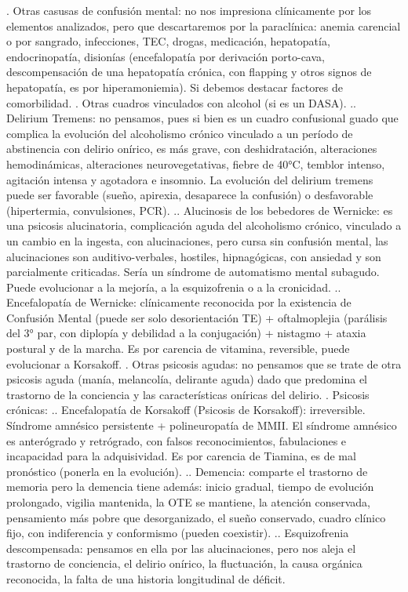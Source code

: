 \documentclass[encares.tex]{subfiles}
\begin{document}
. Otras casusas de confusión mental: no nos impresiona clínicamente por los elementos analizados, pero que descartaremos por la paraclínica: anemia carencial o por sangrado, infecciones, TEC, drogas, medicación, hepatopatía, endocrinopatía, disionías (encefalopatía por derivación porto-cava, descompensación de una hepatopatía crónica, con flapping y otros signos de hepatopatía, es por hiperamoniemia). Si debemos destacar factores de comorbilidad.
. Otras cuadros vinculados con alcohol (si es un DASA).
.. Delirium Tremens: no pensamos, pues si bien es un cuadro confusional guado que complica la evolución del alcoholismo crónico vinculado a un período de abstinencia con delirio onírico, es más grave, con deshidratación, alteraciones hemodinámicas, alteraciones neurovegetativas, fiebre de 40°C, temblor intenso, agitación intensa y agotadora e insomnio. La evolución del delirium tremens puede ser favorable (sueño, apirexia, desaparece la confusión) o desfavorable (hipertermia, convulsiones, PCR).
.. Alucinosis de los bebedores de Wernicke: es una psicosis alucinatoria, complicación aguda del alcoholismo crónico, vinculado a un cambio en la ingesta, con alucinaciones, pero cursa sin confusión mental, las alucinaciones son auditivo-verbales, hostiles, hipnagógicas, con ansiedad y son parcialmente criticadas. Sería un síndrome de automatismo mental subagudo. Puede evolucionar a la mejoría, a la esquizofrenia o a la cronicidad.
.. Encefalopatía de Wernicke: clínicamente reconocida por la existencia de Confusión Mental (puede ser solo desorientación TE) + oftalmoplejia (parálisis del 3° par, con diplopía y debilidad a la conjugación) + nistagmo + ataxia postural y de la marcha. Es por carencia de vitamina, reversible, puede evolucionar a Korsakoff.
. Otras psicosis agudas: no pensamos que se trate de otra psicosis aguda (manía, melancolía, delirante aguda) dado que predomina el trastorno de la conciencia y las características oníricas del delirio.
. Psicosis crónicas:
.. Encefalopatía de Korsakoff (Psicosis de Korsakoff): irreversible. Síndrome amnésico persistente + polineuropatía de MMII. El síndrome amnésico es anterógrado y retrógrado, con falsos reconocimientos, fabulaciones e incapacidad para la adquisividad. Es por carencia de Tiamina, es de mal pronóstico (ponerla en la evolución).
.. Demencia: comparte el trastorno de memoria pero la demencia tiene además: inicio gradual, tiempo de evolución prolongado, vigilia mantenida, la OTE se mantiene, la atención conservada, pensamiento más pobre que desorganizado, el sueño conservado, cuadro clínico fijo, con indiferencia y conformismo (pueden coexistir).
.. Esquizofrenia descompensada: pensamos en ella por las alucinaciones, pero nos aleja el trastorno de conciencia, el delirio onírico, la fluctuación, la causa orgánica reconocida, la falta de una historia longitudinal de déficit.
\end{document}
